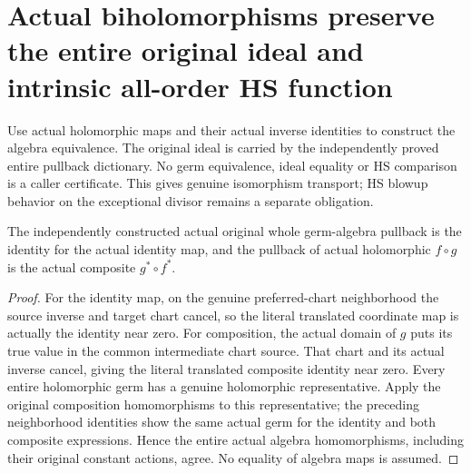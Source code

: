 \section{Actual biholomorphisms preserve the entire original ideal and intrinsic all-order HS function}

Use actual holomorphic maps and their actual inverse identities to construct
the algebra equivalence. The original ideal is carried by the independently
proved entire pullback dictionary. No germ equivalence, ideal equality or HS
comparison is a caller certificate. This gives genuine isomorphism transport;
HS blowup behavior on the exceptional divisor remains a separate obligation.

\begin{lemma}
\label{hir:actual-original-whole-germ-pullback-functorial}
\leanok
The independently constructed actual original whole germ-algebra pullback
is the identity for the actual identity map, and the pullback of actual
holomorphic $f\circ g$ is the actual composite $g^*\circ f^*$.
\end{lemma}
\begin{proof}
For the identity map, on the genuine preferred-chart neighborhood the
source inverse and target chart cancel, so the literal translated coordinate
map is actually the identity near zero. For composition, the actual domain
of $g$ puts its true value in the common intermediate chart source.
That chart and its actual inverse cancel, giving the literal translated
composite identity near zero. Every entire holomorphic germ has a genuine
holomorphic representative. Apply the original composition homomorphisms
to this representative; the preceding neighborhood identities show the
same actual germ for the identity and both composite expressions. Hence
the entire actual algebra homomorphisms, including their original constant
actions, agree. No equality of algebra maps is assumed.
\end{proof}

